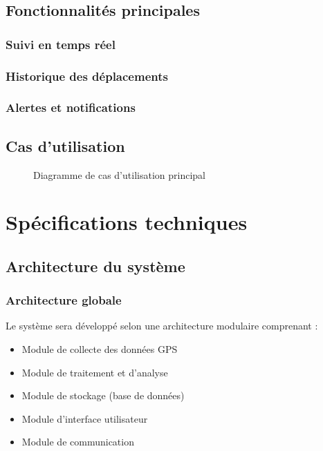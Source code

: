 \documentclass[12pt,a4paper]{article}
\begin{document}
\subsection{Fonctionnalités principales}

\subsubsection{Suivi en temps réel}
\lipsum[6]

\subsubsection{Historique des déplacements}
\lipsum[7]

\subsubsection{Alertes et notifications}
\lipsum[8]

\subsection{Cas d'utilisation}

\begin{figure}[h]
\centering
\caption{Diagramme de cas d'utilisation principal}
\end{figure}

\section{Spécifications techniques}

\subsection{Architecture du système}

\lipsum[9]

\subsubsection{Architecture globale}
Le système sera développé selon une architecture modulaire comprenant :
\begin{itemize}
    \item Module de collecte des données GPS
    \item Module de traitement et d'analyse
    \item Module de stockage (base de données)
    \item Module d'interface utilisateur
    \item Module de communication
\end{itemize}
\end{document}
